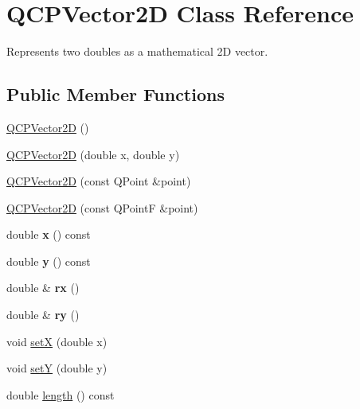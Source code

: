 \hypertarget{class_q_c_p_vector2_d}{}\section{Q\+C\+P\+Vector2D Class Reference}
\label{class_q_c_p_vector2_d}


Represents two doubles as a mathematical 2D vector.  


\subsection*{Public Member Functions}
\begin{DoxyCompactItemize}
\item 
\hyperlink{class_q_c_p_vector2_d_a04c90748c3623044c79fa20788ffbcc6}{Q\+C\+P\+Vector2D} ()
\item 
\hyperlink{class_q_c_p_vector2_d_a47bd86cebc5588dad6ec84349d9098d4}{Q\+C\+P\+Vector2D} (double x, double y)
\item 
\hyperlink{class_q_c_p_vector2_d_ad8f30a064dc37c90a7ba5e6732ceb5bb}{Q\+C\+P\+Vector2D} (const Q\+Point \&point)
\item 
\hyperlink{class_q_c_p_vector2_d_a3c16eba1006c210ffc3299253fef2339}{Q\+C\+P\+Vector2D} (const Q\+PointF \&point)
\item 
\mbox{\label{class_q_c_p_vector2_d_a4a099e1f9788d52cb46deb8139aa6195}} 
double {\bfseries x} () const
\item 
\mbox{\label{class_q_c_p_vector2_d_a6398fb643ba380d7961a4b208f4eecf1}} 
double {\bfseries y} () const
\item 
\mbox{\label{class_q_c_p_vector2_d_a1516252dac9eb5ffb7ddb17fb26e60e0}} 
double \& {\bfseries rx} ()
\item 
\mbox{\label{class_q_c_p_vector2_d_aa8f59a5b54aec8be8e4d1f39db892fea}} 
double \& {\bfseries ry} ()
\item 
void \hyperlink{class_q_c_p_vector2_d_ab4249e6ce7bfc37be56f014c54b761ae}{setX} (double x)
\item 
void \hyperlink{class_q_c_p_vector2_d_ada288019aa8cd51e3b30acfc07b461dc}{setY} (double y)
\item 
double \hyperlink{class_q_c_p_vector2_d_a10adb5ab031fe94f0b64a3c5aefb552e}{length} () const

\end{DoxyCompactItemize}
